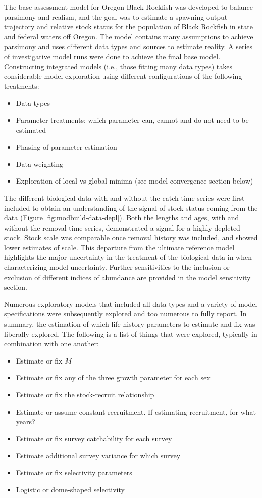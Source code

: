 \documentclass[11pt,
  english,
  letterpaper,
]{article}
\providecommand{\tightlist}{%
  \setlength{\itemsep}{0pt}\setlength{\parskip}{0pt}}
\providecommand{\tightlist}{%
  \setlength{\itemsep}{0pt}\setlength{\parskip}{0pt}}
\begin{document}
The base assessment model for Oregon Black Rockfish was developed to balance parsimony and realism, and the goal was to estimate a spawning output trajectory and relative stock status for the population of Black Rockfish in state and federal waters off Oregon. The model contains many assumptions to achieve parsimony and uses different data types and sources to estimate reality. A series of investigative model runs were done to achieve the final base model. Constructing integrated models (i.e., those fitting many data types) takes considerable model exploration using different configurations of the following treatments:

\begin{itemize}
\tightlist
\item
  Data types
\item
  Parameter treatments: which parameter can, cannot and do not need to be estimated
\item
  Phasing of parameter estimation
\item
  Data weighting
\item
  Exploration of local vs global minima (see model convergence section below)
\end{itemize}

The different biological data with and without the catch time series were first included to obtain an understanding of the signal of stock status coming from the data (Figure \ref{fig:modbuild-data-depl}). Both the lengths and ages, with and without the removal time series, demonstrated a signal for a highly depleted stock. Stock scale was comparable once removal history was included, and showed lower estimates of scale. This departure from the ultimate reference model highlights the major uncertainty in the treatment of the biological data in when characterizing model uncertainty. Further sensitivities to the inclusion or exclusion of different indices of abundance are provided in the model sensitivity section.

Numerous exploratory models that included all data types and a variety of model specifications were subsequently explored and too numerous to fully report. In summary, the estimation of which life history parameters to estimate and fix was liberally explored. The following is a list of things that were explored, typically in combination with one another:

\begin{itemize}
\tightlist
\item
  Estimate or fix \(M\)
\item
  Estimate or fix any of the three growth parameter for each sex
\item
  Estimate or fix the stock-recruit relationship
\item
  Estimate or assume constant recruitment. If estimating recruitment, for what years?
\item
  Estimate or fix survey catchability for each survey
\item
  Estimate additional survey variance for which survey
\item
  Estimate or fix selectivity parameters
\item
  Logistic or dome-shaped selectivity
\end{itemize}
\end{document}
